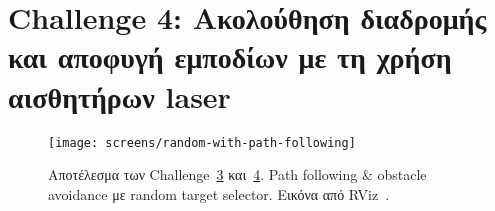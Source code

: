 \section{Challenge 4: Ακολούθηση διαδρομής και αποφυγή εμποδίων με τη χρήση αισθητήρων laser}\label{section:ex4}

\begin{figure}
    \centering
    \texttt{[image: screens/random-with-path-following]}
    \caption{Αποτέλεσμα των Challenge~\hyperref[section:ex3]{3} και~\hyperref[section:ex4]{4}. Path following \& obstacle avoidance με random target selector. Εικόνα από RViz~\protect\cite{rviz}.}
    \label{fig:random-with-path-following}
\end{figure}
